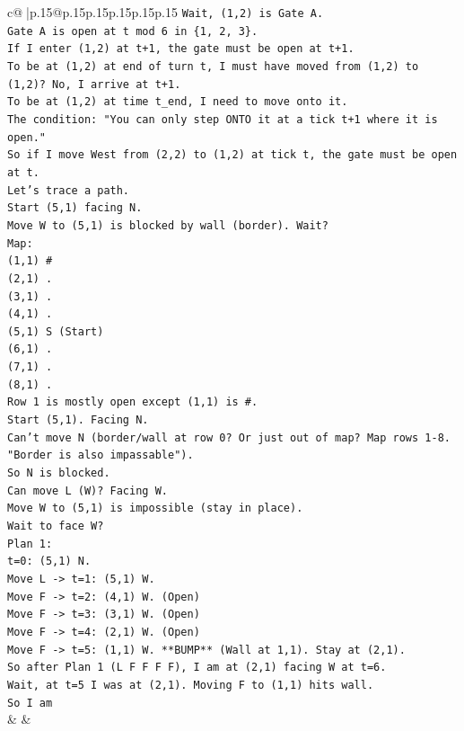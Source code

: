 \documentclass{article}
\begin{document}
{\begin{supertabular}{c@{$\;$}|p{.15\linewidth}@{}p{.15\linewidth}p{.15\linewidth}p{.15\linewidth}p{.15\linewidth}p{.15\linewidth}}
{{{\texttt{Wait, (1,2) is Gate A.} \\
\texttt{Gate A is open at t mod 6 in \{1, 2, 3\}.} \\
\texttt{If I enter (1,2) at t+1, the gate must be open at t+1.} \\
\texttt{To be at (1,2) at end of turn t, I must have moved from (1,2) to (1,2)? No, I arrive at t+1.} \\
\texttt{To be at (1,2) at time t\_end, I need to move onto it.} \\
\texttt{The condition: "You can only step ONTO it at a tick t+1 where it is open."} \\
\texttt{So if I move West from (2,2) to (1,2) at tick t, the gate must be open at t.} \\
\texttt{Let's trace a path.} \\
\texttt{Start (5,1) facing N.} \\
\texttt{Move W to (5,1) is blocked by wall (border). Wait?} \\
\texttt{Map:} \\
\texttt{(1,1) \#} \\
\texttt{(2,1) .} \\
\texttt{(3,1) .} \\
\texttt{(4,1) .} \\
\texttt{(5,1) S (Start)} \\
\texttt{(6,1) .} \\
\texttt{(7,1) .} \\
\texttt{(8,1) .} \\
\texttt{Row 1 is mostly open except (1,1) is \#.} \\
\texttt{Start (5,1). Facing N.} \\
\texttt{Can't move N (border/wall at row 0? Or just out of map? Map rows 1{-}8. "Border is also impassable").} \\
\texttt{So N is blocked.} \\
\texttt{Can move L (W)? Facing W.} \\
\texttt{Move W to (5,1) is impossible (stay in place).} \\
\texttt{Wait to face W?} \\
\texttt{Plan 1:} \\
\texttt{t=0: (5,1) N.} \\
\texttt{Move L {-}> t=1: (5,1) W.} \\
\texttt{Move F {-}> t=2: (4,1) W. (Open)} \\
\texttt{Move F {-}> t=3: (3,1) W. (Open)} \\
\texttt{Move F {-}> t=4: (2,1) W. (Open)} \\
\texttt{Move F {-}> t=5: (1,1) W. **BUMP** (Wall at 1,1). Stay at (2,1).} \\
\texttt{So after Plan 1 (L F F F F), I am at (2,1) facing W at t=6.} \\
\texttt{Wait, at t=5 I was at (2,1). Moving F to (1,1) hits wall.} \\
\texttt{So I am} \\
            }
        }
    }
    & & \\ \\


\end{supertabular}}
\end{document}

